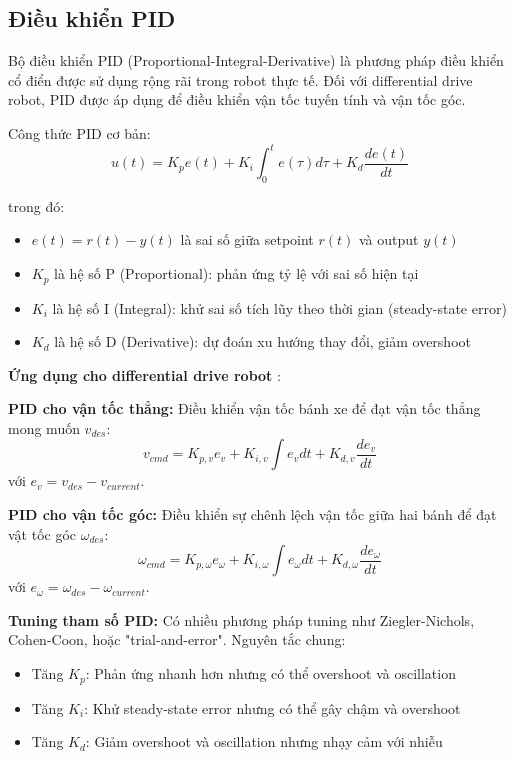 \subsection{Điều khiển PID}
\label{subsec:pid_control}

Bộ điều khiển PID (Proportional-Integral-Derivative) \cite{astrom2006feedback} là phương pháp điều khiển cổ điển được sử dụng rộng rãi trong robot thực tế. Đối với differential drive robot, PID được áp dụng để điều khiển vận tốc tuyến tính và vận tốc góc.

Công thức PID cơ bản:
\begin{equation}
u(t) = K_p e(t) + K_i \int_0^t e(\tau) d\tau + K_d \frac{de(t)}{dt}
\end{equation}

trong đó:
\begin{itemize}
\item $e(t) = r(t) - y(t)$ là sai số giữa setpoint $r(t)$ và output $y(t)$
\item $K_p$ là hệ số P (Proportional): phản ứng tỷ lệ với sai số hiện tại
\item $K_i$ là hệ số I (Integral): khử sai số tích lũy theo thời gian (steady-state error)
\item $K_d$ là hệ số D (Derivative): dự đoán xu hướng thay đổi, giảm overshoot
\end{itemize}

\textbf{Ứng dụng cho differential drive robot} \cite{siegwart2011mobile}:

\textbf{PID cho vận tốc thẳng:} Điều khiển vận tốc bánh xe để đạt vận tốc thẳng mong muốn $v_{des}$:
\begin{equation}
v_{cmd} = K_{p,v} e_v + K_{i,v} \int e_v dt + K_{d,v} \frac{de_v}{dt}
\end{equation}
với $e_v = v_{des} - v_{current}$.

\textbf{PID cho vận tốc góc:} Điều khiển sự chênh lệch vận tốc giữa hai bánh để đạt vật tốc góc $\omega_{des}$:
\begin{equation}
\omega_{cmd} = K_{p,\omega} e_\omega + K_{i,\omega} \int e_\omega dt + K_{d,\omega} \frac{de_\omega}{dt}
\end{equation}
với $e_\omega = \omega_{des} - \omega_{current}$.

\textbf{Tuning tham số PID:} Có nhiều phương pháp tuning như Ziegler-Nichols, Cohen-Coon, hoặc "trial-and-error". Nguyên tắc chung:
\begin{itemize}
\item Tăng $K_p$: Phản ứng nhanh hơn nhưng có thể overshoot và oscillation
\item Tăng $K_i$: Khử steady-state error nhưng có thể gây chậm và overshoot
\item Tăng $K_d$: Giảm overshoot và oscillation nhưng nhạy cảm với nhiễu
\end{itemize}

